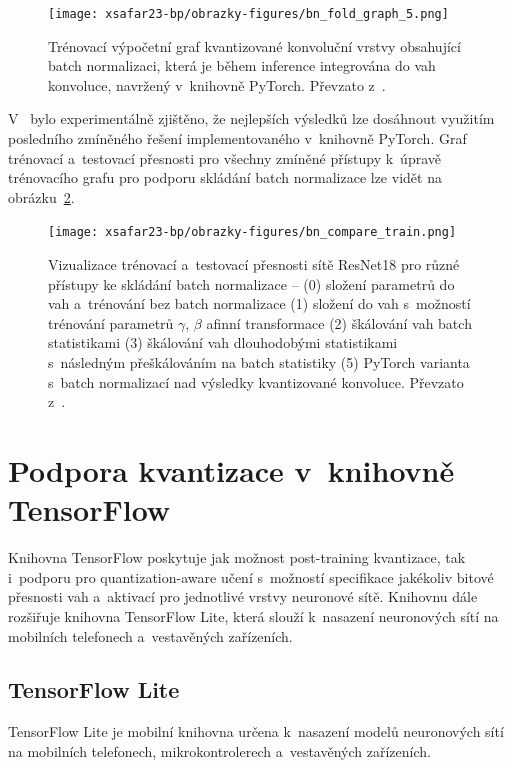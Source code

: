 \begin{figure}[H]
	\centering
	\texttt{[image: xsafar23-bp/obrazky-figures/bn\_fold\_graph\_5.png]}
	\caption{Trénovací výpočetní graf kvantizované konvoluční vrstvy obsahující batch normalizaci, která je během inference integrována do vah konvoluce, navržený v~knihovně PyTorch. Převzato z~\cite{li2022mqbench}.}
	\label{fig:batch_fold_quant_pytorch}
\end{figure}

V~\cite{li2022mqbench} bylo experimentálně zjištěno, že nejlepších výsledků lze dosáhnout využitím posledního zmíněného řešení implementovaného v~knihovně PyTorch. Graf trénovací a~testovací přesnosti pro všechny zmíněné přístupy k~úpravě trénovacího grafu pro podporu skládání batch normalizace lze vidět na obrázku~\ref{fig:bn_fold_compare}.
\begin{figure}[H]
	\centering
	\texttt{[image: xsafar23-bp/obrazky-figures/bn\_compare\_train.png]}
	\caption{Vizualizace trénovací a~testovací přesnosti sítě ResNet18 pro různé přístupy ke skládání batch normalizace -- (0) složení parametrů do vah a~trénování bez batch normalizace (1) složení do vah s~možností trénování parametrů $\gamma$, $\beta$ afinní transformace (2) škálování vah batch statistikami (3) škálování vah dlouhodobými statistikami s~následným přeškálováním na batch statistiky (5) PyTorch varianta s~batch normalizací nad výsledky kvantizované konvoluce. Převzato z~\cite{li2022mqbench}.}
	\label{fig:bn_fold_compare}
\end{figure}

\section{Podpora kvantizace v~knihovně TensorFlow}
\label{section:qat-tensorflow}

Knihovna TensorFlow poskytuje jak možnost post-training kvantizace, tak i~podporu pro quantization-aware učení s~možností specifikace jakékoliv bitové přesnosti vah a~aktivací pro jednotlivé vrstvy neuronové sítě. Knihovnu dále rozšiřuje knihovna TensorFlow Lite, která slouží k~nasazení neuronových sítí na mobilních telefonech a~vestavěných zařízeních.

\subsection{TensorFlow Lite}

TensorFlow Lite je mobilní knihovna určena k~nasazení modelů neuronových sítí na mobilních telefonech, mikrokontrolerech a~vestavěných zařízeních.

